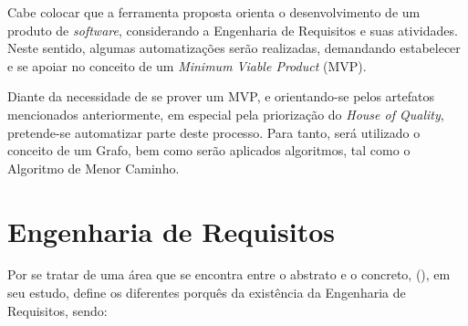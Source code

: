 Cabe colocar que a ferramenta proposta orienta o desenvolvimento de um produto de \textit{software}, considerando a Engenharia de Requisitos e suas atividades. Neste sentido, algumas automatizações serão realizadas, demandando estabelecer e se apoiar no conceito de um \textit{Minimum Viable Product} (MVP).

Diante da necessidade de se prover um MVP, e orientando-se pelos artefatos mencionados anteriormente, em especial pela priorização do \textit{House of Quality}, pretende-se automatizar parte deste processo. Para tanto, será utilizado o conceito de um Grafo, bem como serão aplicados algoritmos, tal como o Algoritmo de Menor Caminho.

\section{Engenharia de Requisitos}

\label{sec:eng_requisitos_ex}

Por se tratar de uma área que se encontra entre o abstrato e o concreto, (\citeyear{westfall_5w2h}), em seu estudo, define os diferentes porquês da existência da Engenharia de Requisitos, sendo:

